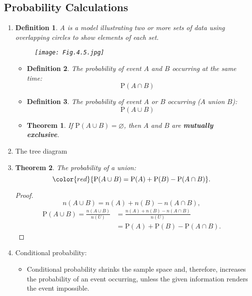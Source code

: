 \documentclass[12pt, a4paper]{article}
\newtheorem{theorem}{Theorem}[subsection]
\newtheorem{definition}{Definition}[subsection]
\newtheorem{proof}{Proof}[subsection]
\def\P{\mathrm{P}}
\begin{document}
\subsection{Probability Calculations}
\begin{enumerate}
    \item 
    \begin{definition} A \textbf{\color{red}{Venn diagram}} is a model illustrating two or more sets of data using overlapping circles to show elements of each set. 
        \begin{figure}[H]
            \center
            \texttt{[image: Fig.4.5.jpg]}
        \end{figure}
    \end{definition}
    \begin{itemize}
        \item \begin{definition}The probability of event $A$ and $B$ occurring at the same time: $$\P(A\cap B)$$\end{definition}
        \item \begin{definition}The probability of event $A$ or $B$ occurring ($A$ union $B$): $$\P(A\cup B)$$\end{definition}
        \item \begin{theorem}If $\P(A\cup B)=\varnothing$, then $A$ and $B$ are \textbf{mutually exclusive}.\end{theorem}
    \end{itemize}
    \item The tree diagram
    \item \begin{theorem}The probability of a union: $${\color{red}{\P(A\cup B)=\P(A)+\P(B)-\P(A\cap B)}}.$$\end{theorem}
    \begin{proof}
        $$n(A\cup B)=n(A)+n(B)-n(A\cap B),$$
        $$\begin{aligned}
            \P(A\cup B)=\frac{n(A\cup B)}{n(U)}&=\frac{n(A)+n(B)-n(A\cap B)}{n(U)}\\
            &=\P(A)+\P(B)-\P(A\cap B).
        \end{aligned}$$
    \end{proof}
    \item Conditional probability: 
    \begin{itemize}
        \item Conditional probability shrinks the sample space and, therefore, increases the probability of an event occurring, unless the given information renders the event impossible. 

\end{itemize}
\end{enumerate}
\end{document}
